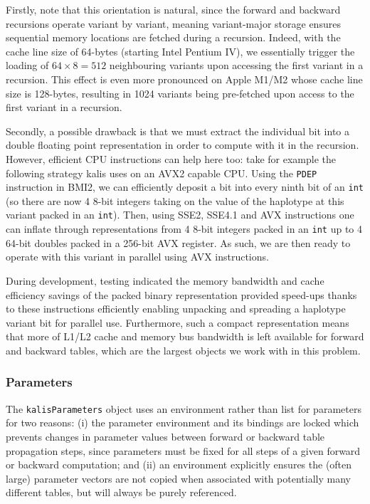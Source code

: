 \documentclass[pdflatex,referee,lineno,sn-nature]{sn-jnl}%
\newcommand{\pkg}[1]{{\fontseries{m}\fontseries{b}\selectfont #1}}
\begin{document}
Firstly, note that this orientation is natural, since the forward and backward recursions operate variant by variant, meaning variant-major storage ensures sequential memory locations are fetched during a recursion.
Indeed, with the cache line size of 64-bytes (starting Intel Pentium IV), we essentially trigger the loading of \(64 \times 8 = 512\) neighbouring variants upon accessing the first variant in a recursion.
This effect is even more pronounced on Apple M1/M2 whose cache line size is 128-bytes, resulting in 1024 variants being pre-fetched upon access to the first variant in a recursion.

Secondly, a possible drawback is that we must extract the individual bit into a double floating point representation in order to compute with it in the recursion.
However, efficient CPU instructions can help here too: take for example the following strategy \pkg{kalis} uses on an AVX2 capable CPU.
Using the \texttt{PDEP} instruction in BMI2, we can efficiently deposit a bit into every ninth bit of an \texttt{int} (so there are now 4 8-bit integers taking on the value of the haplotype at this variant packed in an \texttt{int}).
Then, using SSE2, SSE4.1 and AVX instructions one can inflate through representations from 4 8-bit integers packed in an \texttt{int} up to 4 64-bit doubles packed in a 256-bit AVX register.
As such, we are then ready to operate with this variant in parallel using AVX instructions.

During development, testing indicated the memory bandwidth and cache efficiency savings of the packed binary representation provided speed-ups thanks to these instructions efficiently enabling unpacking and spreading a haplotype variant bit for parallel use.
Furthermore, such a compact representation means that more of L1/L2 cache and memory bus bandwidth is left available for forward and backward tables, which are the largest objects we work with in this problem.



\subsubsection*{Parameters}
\label{parameters}

The \texttt{kalisParameters} object uses an environment rather than list for parameters for two reasons: (i) the parameter environment and its bindings are locked which prevents changes in parameter values between forward or backward table propagation steps, since parameters must be fixed for all steps of a given forward or backward computation; and (ii) an environment explicitly ensures the (often large) parameter vectors are not copied when associated with potentially many different tables, but will always be purely referenced.
\end{document}

